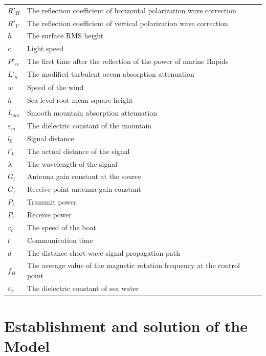 \documentclass{mcmthesis}
\begin{document}
\begin{center}
\begin{longtable}{p{}p{}m{}}
$R{'_H}$       & The reflection coefficient of horizontal polarization wave correction \\
$R{'_V}$       & The reflection coefficient of vertical polarization wave correction \\
$h$       & The surface RMS height \\
$c$       & Light speed \\
$P{'_{re}}$       & The first time after the reflection of the power of marine Rapids \\
$L{'_g}$       & The modified turbulent ocean absorption attenuation \\
$w$        & Speed of the wind \\
$h$       & Sea level root mean square height \\
$L_{gm}$       & Smooth mountain absorption attenuation \\
${\varepsilon _m}$       & The dielectric constant of the mountain \\
$l_0$       & Signal distance \\
$l{'_0}$       & The actual distance of the signal \\
$\lambda $       & The wavelength of the signal                                                \\
$G_t$       & Antenna gain constant at the source \\
$G_r$       & Receive point antenna gain constant \\
$P_t$       & Transmit power \\
$P_r$       & Receive power \\
$v_c$       & The speed of the boat\\
$t$        & Communication time \\
$d$       & The distance short-wave signal propagation path \\
$f_H$       & The average value of the magnetic rotation frequency at the control point                          \\
${\varepsilon _\gamma }$       & The dielectric constant of sea water                                         \\
 \hline
 \end{longtable}
 \end{center}




\section{Establishment and solution of the Model}
\end{document}
